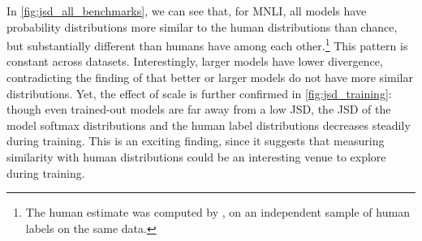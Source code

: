 In \cref{fig:jsd_all_benchmarks}, we can see that, for MNLI, all models have probability distributions more similar to the human distributions than chance, but substantially different than humans have among each other.\footnote{The human estimate was computed by \citet{nie-etal-2020-learn}, on an independent sample of human labels on the same data.}
This pattern is constant across datasets.
Interestingly, larger models have lower divergence, contradicting the finding of \citet{nie-etal-2020-learn} that better or larger models do not have more similar distributions.
Yet, the effect of scale is further confirmed in \cref{fig:jsd_training}: though even trained-out models are far away from a low JSD, the JSD of the model softmax distributions and the human label distributions decreases steadily during training.
This is an exciting finding, since it suggests that measuring similarity with human distributions could be an interesting venue to explore during training.


